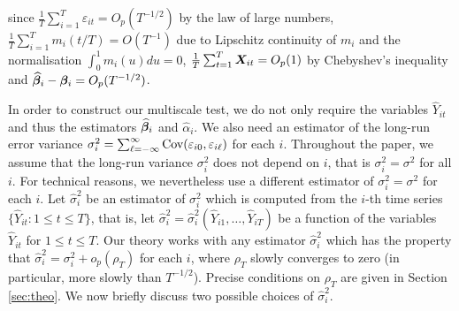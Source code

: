 \documentclass[a4paper,12pt]{article}
\makeatletter
\renewcommand{\eqref}[1]{\tagform@{\ref{#1}}}
\makeatother
\begin{document}
since $\frac{1}{T}\sum_{i=1}^T \varepsilon_{it} = O_p(T^{-1/2})$ by the law of large numbers, $\frac{1}{T}\sum_{i=1}^T m_i(t/T) = O(T^{-1})$ due to Lipschitz continuity of $m_i$ and the normalisation $\int_{0}^1 m_i(u)du = 0$, $\frac{1}{T}\sum_{t=1}^T  \boldsymbol{X}_{it} = O_p(1)$ by Chebyshev's inequality and $\widehat{\bm{\beta}}_i - \bm{\beta}_i = O_p (T^{-1/2})$. 


In order to construct our multiscale test, we do not only require the variables $\widehat{Y}_{it}$ and thus the estimators $\widehat{\bm{\beta}}_i$ and $\widehat{\alpha}_i$. We also need an estimator of the long-run error variance $\sigma_i^2 = \sum\nolimits_{\ell=-\infty}^{\infty} \textnormal{Cov}(\varepsilon_{i0}, \varepsilon_{i\ell})$ for each $i$.
Throughout the paper, we assume that the long-run variance $\sigma_i^2$ does not depend on $i$, that is $\sigma_i^2 = \sigma^2$ for all $i$. For technical reasons, we nevertheless use a different estimator of $\sigma_i^2 = \sigma^2$ for each $i$. Let $\widehat{\sigma}_i^2$ be an estimator of $\sigma_i^2$ which is computed from the $i$-th time series $\{ \widehat{Y}_{it}: 1 \le t \le T \}$, that is, let $\widehat{\sigma}_i^2 = \widehat{\sigma}_i^2(\widehat{Y}_{i1},\ldots,\widehat{Y}_{iT})$ be a function of the variables $\widehat{Y}_{it}$ for $1 \le t \le T$. Our theory works with any estimator $\widehat{\sigma}_i^2$ which has the property that $\widehat{\sigma}_i^2 = \sigma_i^2 + o_p(\rho_T)$ for each $i$, where $\rho_T$ slowly converges to zero (in particular, more slowly than $T^{-1/2}$). Precise conditions on $\rho_T$ are given in Section \ref{sec:theo}. We now briefly discuss two possible choices of $\widehat{\sigma}_i^2$. 
\end{document}
